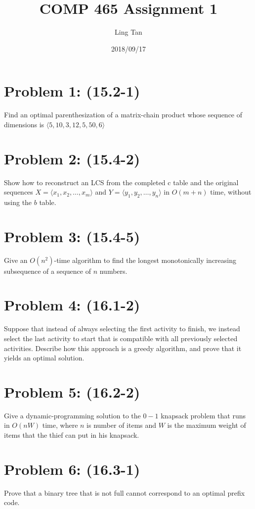 \documentclass[a4paper]{article}
\title{COMP 465 Assignment 1}
\author{Ling Tan}
\date{2018/09/17}
\begin{document}
\maketitle

\section{Problem 1: (15.2-1)} Find an optimal parenthesization of a matrix-chain product whose sequence of dimensions is $\langle5, 10, 3, 12, 5, 50, 6\rangle$

\section{Problem 2: (15.4-2) } Show how to reconstruct an LCS from the completed c table and the original sequences $X = \langle x_1, x_2,\dots, x_m\rangle$ and $Y = \langle y_1, y_2, \dots, y_n\rangle$ in $O(m +n)$ time, without using the $b$ table.

\section{Problem 3: (15.4-5)} Give an $O(n^2)$-time algorithm to find the longest monotonically increasing subsequence of a sequence of $n$ numbers.

\section{Problem 4: (16.1-2)} Suppose that instead of always selecting the first activity to finish, we instead select the last activity to start that is compatible with all previously selected activities. Describe how this approach is a greedy algorithm, and prove that it yields an optimal solution.

\section{Problem 5: (16.2-2)} Give a dynamic-programming solution to the $0-1$ knapsack problem that runs in $O(n W)$ time, where $n$ is number of items and $W$ is the maximum weight of items that the thief can put in his knapsack.

\section{Problem 6: (16.3-1)} Prove that a binary tree that is not full cannot correspond to an optimal prefix code.
\end{document}
